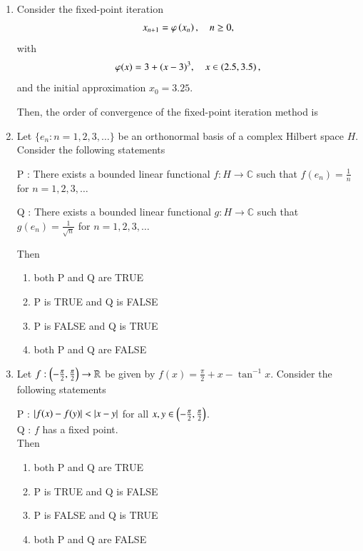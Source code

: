 \documentclass[journal,12pt,onecolumn]{IEEEtran}
\theoremstyle{remark}
\begin{document}
\begin{enumerate}[start=1, label=Q.\arabic*]
\hfill{}
\item Consider the fixed\mbox{-}point iteration
\[
x_{n+1}=\varphi\left(x_{n}\right),\quad n \ge 0,
\]
with
\[
\varphi(x)=3+(x-3)^{3},\quad x \in \left(2.5,3.5\right),
\]
and the initial approximation $x_{0}=3.25$.  

Then, the order of convergence of the fixed\mbox{-}point iteration method is
\begin{enumerate}
\end{enumerate}

\hfill{}


\item Let $\{e_{n} : n=1,2,3,\dots\}$ be an orthonormal basis of a complex Hilbert space $H$.  
Consider the following statements\brak{:}

P : There exists a bounded linear functional $f : H \to \mathbb{C}$ such that $f(e_{n})=\tfrac{1}{n}$ for $n=1,2,3,\dots$  

Q : There exists a bounded linear functional $g : H \to \mathbb{C}$ such that $g(e_{n})=\tfrac{1}{\sqrt{n}}$ for $n=1,2,3,\dots$  

Then
\begin{enumerate}
\item both P and Q are TRUE
\item P is TRUE and Q is FALSE
\item P is FALSE and Q is TRUE
\item both P and Q are FALSE
\end{enumerate}

\hfill{}

\item Let $f : \left(-\tfrac{\pi}{2},\tfrac{\pi}{2}\right) \to \mathbb{R}$ be given by $f(x)=\tfrac{\pi}{2}+x-\tan^{-1}x$.  
Consider the following statements\brak{:}

P : $\left\vert f(x)-f(y)\right\vert<\left\vert x-y\right\vert$ for all $x,y \in \left(-\tfrac{\pi}{2},\tfrac{\pi}{2}\right)$.\\
Q : $f$ has a fixed point.\\

Then
\begin{enumerate}
\item both P and Q are TRUE
\item P is TRUE and Q is FALSE
\item P is FALSE and Q is TRUE
\item both P and Q are FALSE
\end{enumerate}


\end{enumerate}
\end{document}
